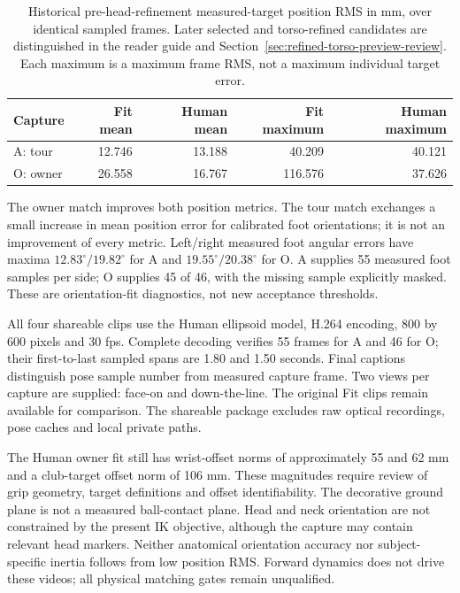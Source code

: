 \documentclass[11pt,a4paper]{article}
\begin{document}
\begin{table}[!htb]
\centering
\caption{Historical pre-head-refinement measured-target position RMS in mm,
over identical sampled frames. Later selected and torso-refined candidates
are distinguished in the reader guide and Section~\ref{sec:refined-torso-preview-review}.
Each maximum is a maximum frame RMS, not a maximum individual target error.}
\begin{tabular}{lrrrr}
\toprule
Capture & Fit mean & Human mean & Fit maximum & Human maximum \\
\midrule
A: tour & 12.746 & 13.188 & 40.209 & 40.121 \\
O: owner & 26.558 & 16.767 & 116.576 & 37.626 \\
\bottomrule
\end{tabular}
\end{table}
The owner match improves both position metrics. The tour match exchanges a
small increase in mean position error for calibrated foot orientations;
it is not an improvement of every metric. Left/right measured foot angular
errors have maxima $12.83^\circ/19.82^\circ$ for A and
$19.55^\circ/20.38^\circ$ for O. A supplies 55 measured foot samples per side;
O supplies 45 of 46, with the missing sample explicitly masked. These are
orientation-fit diagnostics, not new acceptance thresholds.

All four shareable clips use the Human ellipsoid model, H.264 encoding,
800 by 600 pixels and 30 fps. Complete decoding verifies 55 frames for A
and 46 for O; their first-to-last sampled spans are 1.80 and 1.50 seconds.
Final captions distinguish pose sample number from measured capture frame.
Two views per capture are supplied: face-on and down-the-line. The original
Fit clips remain available for comparison. The shareable package excludes
raw optical recordings, pose caches and local private paths.

The Human owner fit still has wrist-offset norms of approximately 55 and
62 mm and a club-target offset norm of 106 mm. These magnitudes require
review of grip geometry, target definitions and offset identifiability.
The decorative ground plane is not a measured ball-contact plane.
Head and neck orientation are not constrained by the present IK objective,
although the capture may contain relevant head markers. Neither anatomical
orientation accuracy nor subject-specific inertia follows from low position
RMS. Forward dynamics does not drive these videos; all physical matching
gates remain unqualified.
\end{document}
